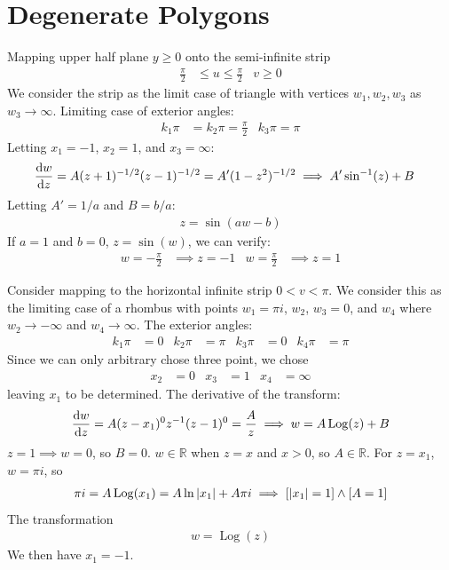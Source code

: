 \documentclass[12pt, english]{book}
\DeclareMathOperator\Log{Log}
\begin{document}
	\section{Degenerate Polygons} \label{Degenerate Polygons Section - Complex}
	
	\begin{example}
		Mapping upper half plane \(y \geq 0\) onto the semi-infinite strip
		\begin{align*}
			\frac{\pi}{2} &\leq u \leq \frac{\pi}{2} &
			v \geq 0
		\end{align*}
		We consider the strip as the limit case of triangle with vertices \(w_1, w_2, w_3\) as \(w_3 \rightarrow \infty\).
		Limiting case of exterior angles:
		\begin{align*}
			k_1 \pi &= k_2 \pi = \frac{\pi}{2} &
			k_3 \pi = \pi
		\end{align*}
		Letting \(x_1 = -1\), \(x_2 = 1\), and \(x_3 = \infty\):
		\begin{align*}
			\dv{w}{z} &= A(z+1)^{-1/2}(z-1)^{-1/2} = A'(1-z^2)^{-1/2}
			\implies A' \sin[-1](z) + B
		\end{align*}
		Letting \(A' = 1/a\) and \(B = b/a\):
		\begin{align*}
			z = \sin(aw - b)
		\end{align*}
		If \(a=1\) and \(b = 0\), \(z = \sin(w)\), we can verify:
		\begin{align*}
			w = -\frac{\pi}{2} &\implies z = -1 &
			w = \frac{\pi}{2} &\implies z = 1
		\end{align*}
	\end{example}

	\begin{example}
		Consider mapping to the horizontal infinite strip \(0 < v < \pi\). We consider this as the limiting case of a rhombus with points \(w_1 = \pi i\), \(w_2\), \(w_3 = 0\), and \(w_4\) where \(w_2 \rightarrow - \infty\) and \(w_4 \rightarrow \infty\). The exterior angles:
		\begin{align*}
			k_1 \pi &= 0 &
			k_2 \pi &= \pi &
			k_3 \pi &= 0 &
			k_4 \pi &= \pi
		\end{align*}
		Since we can only arbitrary chose three point, we chose 
		\begin{align*}
			x_2 &= 0 &
			x_3 &= 1 &
			x_4 &= \infty
		\end{align*}
		leaving \(x_1\) to be determined. The derivative of the transform:
		\begin{align*}
			\dv{w}{z} = A(z-x_1)^0 z^{-1} (z-1)^0 = \frac{A}{z}
			\implies w = A \Log(z) + B
		\end{align*}
		\(z = 1 \implies w = 0\), so \(B = 0\). \(w \in \mathbb{R}\) when \(z = x\) and \(x > 0\), so \(A \in \mathbb{R}\). For \(z = x_1\), \(w = \pi i\), so 
		\begin{align*}
			\pi i = A \Log(x_1) = A \ln \abs{x_1} + A \pi i 
			\implies [\abs{x_1} = 1] \land [A = 1]
		\end{align*}
		The transformation
		\begin{align*}
			w = \Log(z)
		\end{align*}
		We then have \(x_1 = -1\).
	\end{example}
	
\end{document}

